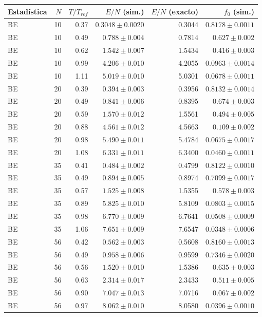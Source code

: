 \begin{tabular}{lrrrrr}
\hline
Estadística & $N$ & $T/T_{ref}$ & $E/N$ (sim.) & $E/N$ (exacto) & $f_0$ (sim.) \\
\hline
BE & 10 & 0.37 & $0.3048 \pm 0.0020$ & 0.3044 & $0.8178 \pm 0.0011$ \\
BE & 10 & 0.49 & $0.788 \pm 0.004$ & 0.7814 & $0.627 \pm 0.002$ \\
BE & 10 & 0.62 & $1.542 \pm 0.007$ & 1.5434 & $0.416 \pm 0.003$ \\
BE & 10 & 0.99 & $4.206 \pm 0.010$ & 4.2055 & $0.0963 \pm 0.0014$ \\
BE & 10 & 1.11 & $5.019 \pm 0.010$ & 5.0301 & $0.0678 \pm 0.0011$ \\
BE & 20 & 0.39 & $0.394 \pm 0.003$ & 0.3956 & $0.8132 \pm 0.0014$ \\
BE & 20 & 0.49 & $0.841 \pm 0.006$ & 0.8395 & $0.674 \pm 0.003$ \\
BE & 20 & 0.59 & $1.570 \pm 0.012$ & 1.5561 & $0.494 \pm 0.005$ \\
BE & 20 & 0.88 & $4.561 \pm 0.012$ & 4.5663 & $0.109 \pm 0.002$ \\
BE & 20 & 0.98 & $5.490 \pm 0.011$ & 5.4784 & $0.0675 \pm 0.0017$ \\
BE & 20 & 1.08 & $6.331 \pm 0.011$ & 6.3400 & $0.0460 \pm 0.0011$ \\
BE & 35 & 0.41 & $0.484 \pm 0.002$ & 0.4799 & $0.8122 \pm 0.0010$ \\
BE & 35 & 0.49 & $0.894 \pm 0.005$ & 0.8974 & $0.7099 \pm 0.0017$ \\
BE & 35 & 0.57 & $1.525 \pm 0.008$ & 1.5355 & $0.578 \pm 0.003$ \\
BE & 35 & 0.89 & $5.825 \pm 0.010$ & 5.8109 & $0.0803 \pm 0.0015$ \\
BE & 35 & 0.98 & $6.770 \pm 0.009$ & 6.7641 & $0.0508 \pm 0.0009$ \\
BE & 35 & 1.06 & $7.651 \pm 0.009$ & 7.6547 & $0.0348 \pm 0.0006$ \\
BE & 56 & 0.42 & $0.562 \pm 0.003$ & 0.5608 & $0.8160 \pm 0.0013$ \\
BE & 56 & 0.49 & $0.958 \pm 0.006$ & 0.9599 & $0.7346 \pm 0.0020$ \\
BE & 56 & 0.56 & $1.520 \pm 0.010$ & 1.5386 & $0.635 \pm 0.003$ \\
BE & 56 & 0.63 & $2.314 \pm 0.017$ & 2.3433 & $0.511 \pm 0.005$ \\
BE & 56 & 0.90 & $7.047 \pm 0.013$ & 7.0716 & $0.067 \pm 0.002$ \\
BE & 56 & 0.97 & $8.062 \pm 0.010$ & 8.0580 & $0.0396 \pm 0.0010$ \\

\end{tabular}
